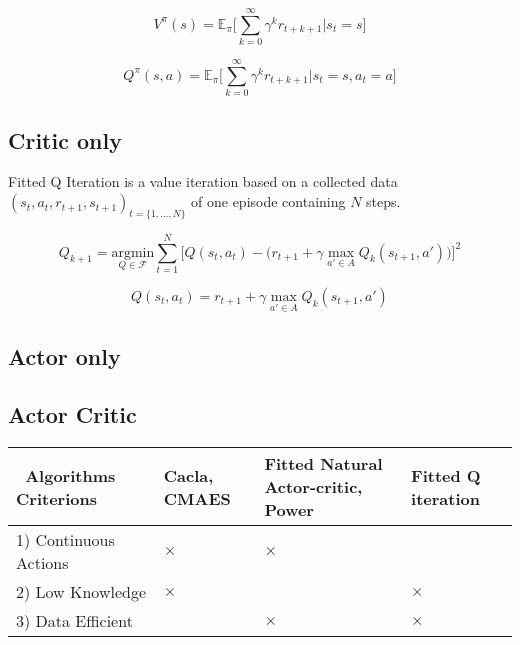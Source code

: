 \begin{equation}
 V^\pi(s) = \mathbb{E}_\pi \Big[ \sum_{k=0}^{\infty} \gamma^k r_{t+k+1} \Big| s_t = s \Big]
\end{equation}

\begin{equation}
 Q^\pi(s, a) = \mathbb{E}_\pi \Big[ \sum_{k=0}^{\infty} \gamma^k r_{t+k+1} \Big| s_t = s, a_t = a \Big]
\end{equation}


\subsection{Critic only}


Fitted Q Iteration \cite{Riedmiller2005} is a value iteration based on a collected data $(s_t, a_t,r_{t+1}, s_{t+1})_{t=\{1,...,N\}}$ of one episode containing $N$ steps.

\begin{equation}
 Q_{k+1} = \underset{Q \in \mathcal{F}}{\text{argmin}} \sum_{t=1}^{N} \Big[ Q(s_t, a_t) - \big( r_{t+1} + \gamma \underset{a' \in A}{\text{ max }} Q_k(s_{t+1}, a') \big) \Big]^2
\end{equation}

\begin{equation}
 Q(s_t, a_t) =  r_{t+1} + \gamma \underset{a' \in A}{\text{ max }} Q_k(s_{t+1}, a')
\end{equation}


\subsection{Actor only}

\subsection{Actor Critic}

\begin{tabular}{|p{3.4cm}|>{\centering\arraybackslash}p{1.2cm}|>{\centering\arraybackslash}p{3cm}|>{\centering\arraybackslash}p{1.8cm}|}
 \hline
 ~\mbox{Algorithms} ~ \mbox{Criterions} & Cacla, CMAES & Fitted Natural Actor-critic, Power & Fitted Q iteration \\ \hline
 1) Continuous Actions & $\times$ & $\times$ & \\ \hline
 2) Low Knowledge & $\times$ & & $\times$ \\ \hline
 3) Data Efficient &  & $\times$ & $\times$\\ \hline
\end{tabular}


